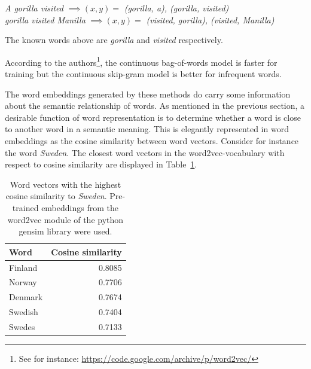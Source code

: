 \begin{center}
\textit{A gorilla visited} $\implies (x,y) = $ \textit{(gorilla, a), (gorilla, visited)} \\ \vspace{1em}
\textit{gorilla visited Manilla} $\implies (x,y) = $ \textit{(visited, gorilla), (visited, Manilla)}
\end{center}

The known words above are \textit{gorilla} and \textit{visited} respectively. 

According to the authors\footnote{See for instance: \url{https://code.google.com/archive/p/word2vec/}}, the continuous bag-of-words model is faster for training but the continuous skip-gram model is better for infrequent words. 

The word embeddings generated by these methods do carry some information about the semantic relationship of words. As mentioned in the previous section, a desirable function of word representation is to determine whether a word is close to another word in a semantic meaning. This is elegantly represented in word embeddings as the cosine similarity between word vectors. Consider for instance the word \textit{Sweden}. The closest word vectors in the word2vec-vocabulary with respect to cosine similarity are displayed in Table~\ref{tab:cossim}.

\begin{table}[h!]
    \centering
    \begin{tabular}{lr}
    \hline
        \textbf{Word} & \textbf{Cosine similarity}  \\
        \hline \hline 
        Finland & 0.8085 \\
        Norway  & 0.7706 \\
        Denmark & 0.7674 \\
        Swedish & 0.7404 \\ 
        Swedes  & 0.7133 \\
        \hline 
    \end{tabular}
    \caption{Word vectors with the highest cosine similarity to \emph{Sweden}. Pre-trained embeddings from the word2vec module of the python gensim library were used.}
\label{tab:cossim}
\end{table}

